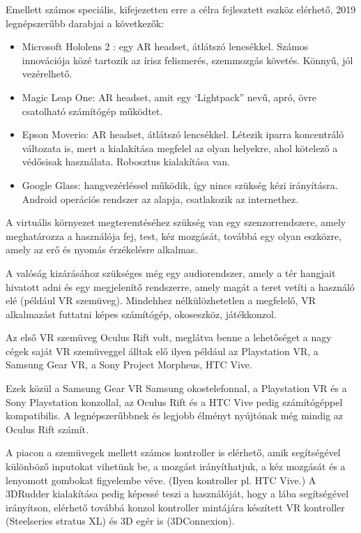 Emellett számos speciális, kifejezetten erre a célra fejlesztett eszköz elérhető, 2019 legnépszerűbb darabjai a következők:
\begin{itemize}
\item Microsoft Hololens 2 :  egy AR headset, átlátszó lencsékkel. Számos innovációja közé tartozik az írisz felismerés, szemmozgás követés. Könnyű, jól vezérelhető.
\item Magic Leap One:  AR headset, amit egy ‘Lightpack” nevű, apró, övre csatolható számítógép működtet. 
\item Epson Moverio: AR headset, átlátszó lencsékkel. Létezik iparra koncentráló változata is, mert a kialakítása megfelel az olyan helyekre, ahol kötelező a védősisak használata. Robosztus kialakítása van. 
\item Google Glass: hangvezérléssel működik, így nincs szükség kézi irányításra. Android operációs rendszer az alapja, csatlakozik az internethez.
\end{itemize}


A virtuális környezet megteremtéséhez szükség van egy szenzorrendszere, amely meghatározza a használója fej, test, kéz mozgását, továbbá egy olyan eszközre, amely az erő és nyomás érzékelésre alkalmas.

A valóság kizárásához szükséges még egy audiorendszer, amely a tér hangjait hivatott adni és egy megjelenítő rendszerre, amely magát a teret vetíti a használó elé (például VR szemüveg).
Mindehhez nélkülözhetetlen a megfelelő, VR alkalmazást futtatni képes számítógép, okoseszköz, játékkonzol. 

Az első VR szemüveg Oculus Rift volt, meglátva benne a lehetőséget a nagy cégek saját VR szemüveggel álltak elő ilyen például az Playstation VR, a Samsung Gear VR, a Sony Project Morpheus, HTC Vive.

Ezek közül a Samsung Gear VR Samsung okostelefonnal, a Playstation VR és a Sony Playstation konzollal, az Oculus Rift és a HTC Vive pedig számítógéppel kompatibilis. A legnépszerűbbnek és legjobb élményt nyújtónak még mindig az Oculus Rift számít.

A piacon a szemüvegek mellett számos kontroller is elérhető, amik segítségével különböző inputokat vihetünk be, a mozgást irányíthatjuk, a kéz mozgását és a lenyomott gombokat figyelembe véve. (Ilyen kontroller pl. HTC Vive.) A 3DRudder kialakítása pedig képessé teszi a használóját, hogy a lába segítségével irányítson, elérhető továbbá konzol kontroller mintájára készített VR kontroller (Steelseries stratus XL) és 3D egér is (3DConnexion).

